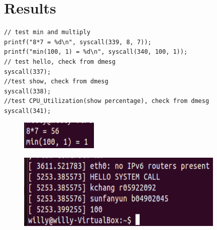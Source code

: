 \documentclass{article}
\begin{document}
    \section{Results}
            \begin{verbatim}
// test min and multiply
printf("8*7 = %d\n", syscall(339, 8, 7));
printf("min(100, 1) = %d\n", syscall(340, 100, 1));
// test hello, check from dmesg
syscall(337);
//test show, check from dmesg
syscall(338);
//test CPU_Utilization(show percentage), check from dmesg
syscall(341);
            \end{verbatim}
            \begin{figure}[!htb]
                \begin{flushleft}
                    \includegraphics[scale=0.7]{result1.png}
                \end{flushleft}
            \end{figure}
            \begin{figure}[!htb]
                \begin{flushleft}
                    \includegraphics[scale=0.4]{result2.png}
                \end{flushleft}
            \end{figure}
\end{document}
